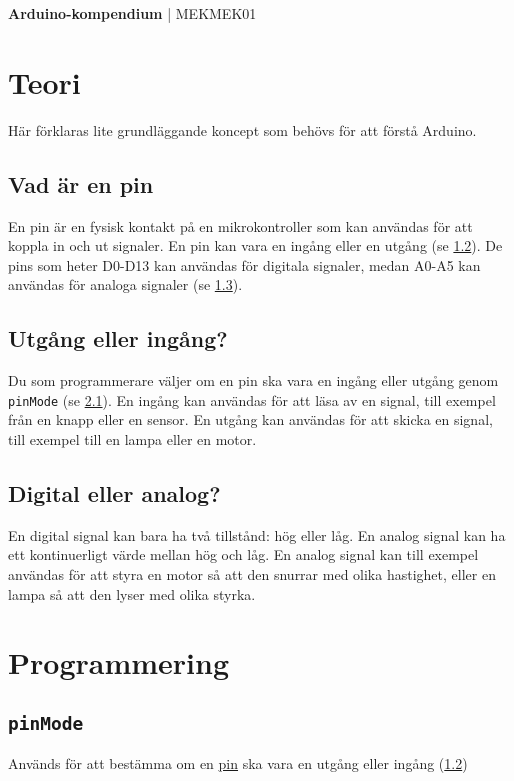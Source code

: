 \documentclass[11pt]{article}
\begin{document}
\raggedright{}
\begin{center}
      \textbf{\huge{Arduino-kompendium}}
      \huge{| MEKMEK01}
\end{center}
\vspace{2em}

\tableofcontents

\newpage

\section{Teori}
Här förklaras lite grundläggande koncept som behövs för att förstå Arduino.

\subsection{Vad är en pin}\label{sec:pin}
En pin är en fysisk kontakt på en mikrokontroller som kan användas för att
koppla in och ut signaler. En pin kan vara en ingång eller en utgång (se
\ref{sec:io}). De pins som heter D0-D13 kan användas för digitala signaler,
medan A0-A5 kan användas för analoga signaler (se \ref{sec:analog-digital}).

\subsection{Utgång eller ingång?}\label{sec:io}
Du som programmerare väljer om en pin ska vara en ingång eller utgång genom
\texttt{pinMode} (se \ref{sec:pinmode}). En ingång kan användas för att läsa av
en signal, till exempel från en knapp eller en sensor. En utgång kan användas
för att skicka en signal, till exempel till en lampa eller en motor.

\subsection{Digital eller analog?}\label{sec:analog-digital}
En digital signal kan bara ha två tillstånd: hög eller låg. En analog signal
kan ha ett kontinuerligt värde mellan hög och låg. En analog signal kan till
exempel användas för att styra en motor så att den snurrar med olika hastighet,
eller en lampa så att den lyser med olika styrka.

\section{Programmering}
\subsection{\texttt{pinMode}}\label{sec:pinmode}
Används för att bestämma om en \hyperref[sec:pin]{pin} ska vara en utgång eller
ingång (\ref{sec:io})
\end{document}
